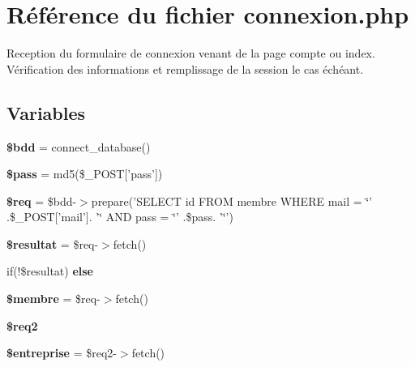 \hypertarget{connexion_8php}{\section{Référence du fichier connexion.\-php}
\label{connexion_8php}
}


Reception du formulaire de connexion venant de la page compte ou index. Vérification des informations et remplissage de la session le cas échéant.  


\subsection*{Variables}
\begin{DoxyCompactItemize}
\item 
\hypertarget{connexion_8php_a94f91e878bce0991e2cd595c5dd79b3f}{{\bfseries \$bdd} = connect\-\_\-database()}\label{connexion_8php_a94f91e878bce0991e2cd595c5dd79b3f}

\item 
\hypertarget{connexion_8php_a12ec2780b52bd1c54d38c2f981c0349f}{{\bfseries \$pass} = md5(\$\-\_\-\-P\-O\-S\-T\mbox{[}'pass'\mbox{]})}\label{connexion_8php_a12ec2780b52bd1c54d38c2f981c0349f}

\item 
\hypertarget{connexion_8php_a63a7a283ea5dee8af1e2d5a3435bf370}{{\bfseries \$req} = \$bdd-\/$>$prepare('S\-E\-L\-E\-C\-T id F\-R\-O\-M membre W\-H\-E\-R\-E mail = \char`\"{}' .\$\-\_\-\-P\-O\-S\-T\mbox{[}'mail'\mbox{]}. '\char`\"{} A\-N\-D pass = \char`\"{}' .\$pass. '\char`\"{}')}\label{connexion_8php_a63a7a283ea5dee8af1e2d5a3435bf370}

\item 
\hypertarget{connexion_8php_ab105533b60f7700245ebaa60e4d41336}{{\bfseries \$resultat} = \$req-\/$>$fetch()}\label{connexion_8php_ab105533b60f7700245ebaa60e4d41336}

\item 
if(!\$resultat) {\bfseries else}
\item 
\hypertarget{connexion_8php_aa000a46a528298c316b1fdf788402a63}{{\bfseries \$membre} = \$req-\/$>$fetch()}\label{connexion_8php_aa000a46a528298c316b1fdf788402a63}

\item 
{\bfseries \$req2}
\item 
\hypertarget{connexion_8php_a6d3423f147c69f4f47f014654a57fc93}{{\bfseries \$entreprise} = \$req2-\/$>$fetch()}\label{connexion_8php_a6d3423f147c69f4f47f014654a57fc93}


\end{DoxyCompactItemize}
